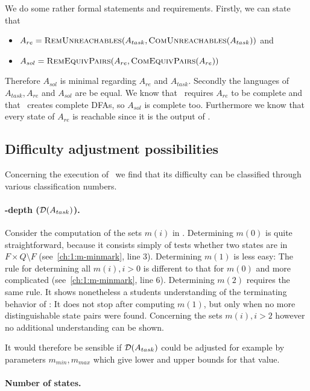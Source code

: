 We do some rather formal statements and requirements. Firstly, we can state that
\begin{itemize}
	\item $A_{re} = \textsc{RemUnreachables}(A_{task}, \textsc{ComUnreachables}(A_{task}))$ and
	\item $A_{sol} = \textsc{RemEquivPairs}(A_{re}, \textsc{ComEquivPairs}(A_{re}))$
\end{itemize}
Therefore $A_{sol}$ is minimal regarding $A_{re}$ and $A_{task}$. Secondly the languages of $A_{task}, A_{re}$ and $A_{sol}$ are be equal. We know that \CompDist\ requires $A_{re}$ to be complete and that \RemEq\ creates complete DFAs, so $A_{sol}$ is complete too. Furthermore we know that every state of $A_{re}$ is reachable since it is the output of \RemUnr.


\subsection{Difficulty adjustment possibilities}

Concerning the execution of \MinAlg\ we find that its difficulty can be classified through various classification numbers.

\paragraph*{\CompDist-depth ($\mathcal{D}(A_{task})$).}

Consider the computation of the sets $m(i)$ in \CompDist. Determining $m(0)$ is quite straightforward, because it consists simply of tests whether two states are in $F \times Q \setminus F$ (see~\ref{ch:1:m-minmark}, line 3). Determining $m(1)$ is less easy: The rule for determining all $m(i), i > 0$ is different to that for $m(0)$ and more complicated (see~\ref{ch:1:m-minmark}, line 6). Determining $m(2)$ requires the same rule. It shows nonetheless a students understanding of the terminating behavior of \CompDist: It does not stop after computing $m(1)$, but only when no more distinguishable state pairs were found. Concerning the sets $m(i), i > 2$ however no additional understanding can be shown.

It would therefore be sensible if $\mathcal{D}(A_{task})$ could be adjusted for example by parameters $m_{min}, m_{max}$ which give lower and upper bounds for that value.

\paragraph*{Number of states.}

